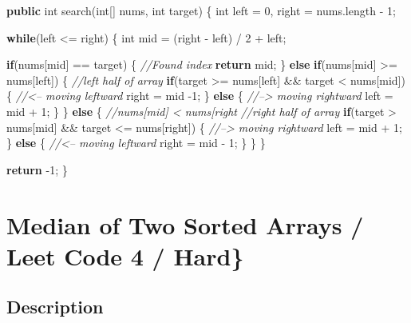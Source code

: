 \documentclass[]{book}
\newenvironment{Shaded}{\begin{snugshade}}{\end{snugshade}}
\newcommand{\CommentTok}[1]{\textcolor[rgb]{0.56,0.35,0.01}{\textit{#1}}}
\newcommand{\DataTypeTok}[1]{\textcolor[rgb]{0.13,0.29,0.53}{#1}}
\newcommand{\DecValTok}[1]{\textcolor[rgb]{0.00,0.00,0.81}{#1}}
\newcommand{\FunctionTok}[1]{\textcolor[rgb]{0.00,0.00,0.00}{#1}}
\newcommand{\KeywordTok}[1]{\textcolor[rgb]{0.13,0.29,0.53}{\textbf{#1}}}
\newcommand{\NormalTok}[1]{#1}
\begin{document}
\begin{Shaded}
\begin{Highlighting}[]
\KeywordTok{public} \DataTypeTok{int} \FunctionTok{search}\NormalTok{(}\DataTypeTok{int}\NormalTok{[] nums, }\DataTypeTok{int}\NormalTok{ target) \{}
    \DataTypeTok{int}\NormalTok{ left = }\DecValTok{0}\NormalTok{, right = nums.}\FunctionTok{length}\NormalTok{ - }\DecValTok{1}\NormalTok{;}

    \KeywordTok{while}\NormalTok{(left <= right) \{}
        \DataTypeTok{int}\NormalTok{ mid = (right - left) / }\DecValTok{2}\NormalTok{ + left;}

        \KeywordTok{if}\NormalTok{(nums[mid] == target) \{}
            \CommentTok{//Found index}
            \KeywordTok{return}\NormalTok{ mid;}
\NormalTok{        \} }\KeywordTok{else} \KeywordTok{if}\NormalTok{(nums[mid] >= nums[left]) \{}
            \CommentTok{//left half of array}
            \KeywordTok{if}\NormalTok{(target >= nums[left] && target < nums[mid]) \{}
                \CommentTok{//<-- moving leftward}
\NormalTok{                right = mid }\DecValTok{-1}\NormalTok{;}
\NormalTok{            \} }\KeywordTok{else}\NormalTok{ \{}
                \CommentTok{//--> moving rightward}
\NormalTok{                left = mid + }\DecValTok{1}\NormalTok{;}
\NormalTok{            \}}
\NormalTok{        \} }\KeywordTok{else}\NormalTok{ \{}
            \CommentTok{//nums[mid] < nums[right}
            \CommentTok{//right half of array}
            \KeywordTok{if}\NormalTok{(target > nums[mid] && target <= nums[right]) \{}
                \CommentTok{//--> moving rightward}
\NormalTok{                left = mid + }\DecValTok{1}\NormalTok{;}
\NormalTok{            \} }\KeywordTok{else}\NormalTok{ \{}
                \CommentTok{//<-- moving leftward}
\NormalTok{                right = mid - }\DecValTok{1}\NormalTok{;}
\NormalTok{            \}}
\NormalTok{        \}}
\NormalTok{    \}}

    \KeywordTok{return} \DecValTok{-1}\NormalTok{;}
\NormalTok{\}}
\end{Highlighting}
\end{Shaded}

\hypertarget{median-of-two-sorted-arrays-leet-code-4-hard}{%
\section{Median of Two Sorted Arrays / Leet Code 4 / Hard\}}\label{median-of-two-sorted-arrays-leet-code-4-hard}}

\hypertarget{description-12}{%
\subsection{Description}\label{description-12}}
\end{document}
